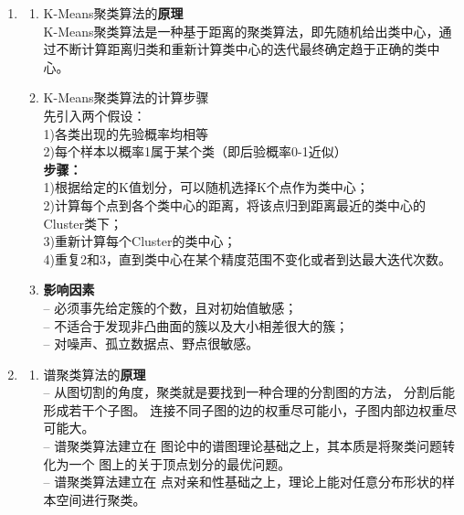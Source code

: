 \documentclass[a4paper,11pt,onecolumn,oneside,UTF8]{article}
\begin{document}
\begin{enumerate}
\begin{enumerate}[(1)]
            \end{enumerate}
      \item
            \begin{enumerate}[(1)]
                  \item K-Means聚类算法的\textbf{原理}\\
                        K-Means聚类算法是一种基于距离的聚类算法，即先随机给出类中心，通过不断计算距离归类和重新计算类中心的迭代最终确定趋于正确的类中心。
                  \item K-Means聚类算法的计算步骤\\
                        先引入两个假设：\\
                        1)各类出现的先验概率均相等\\
                        2)每个样本以概率1属于某个类（即后验概率0-1近似）\\
                        \textbf{步骤：}\\
                        1)根据给定的K值划分，可以随机选择K个点作为类中心；\\
                        2)计算每个点到各个类中心的距离，将该点归到距离最近的类中心的Cluster类下；\\
                        3)重新计算每个Cluster的类中心；\\
                        4)重复2和3，直到类中心在某个精度范围不变化或者到达最大迭代次数。
                  \item \textbf{影响因素}\\
                        – 必须事先给定簇的个数，且对初始值敏感；\\
                        – 不适合于发现非凸曲面的簇以及大小相差很大的簇；\\
                        – 对噪声、孤立数据点、野点很敏感。
            \end{enumerate}
      \item
            \begin{enumerate}[(1)]
                  \item 谱聚类算法的\textbf{原理}\\
                        – 从图切割的角度，聚类就是要找到一种合理的分割图的方法， 分割后能形成若干个子图。
                        连接不同子图的边的权重尽可能小，子图内部边权重尽可能大。\\
                        – 谱聚类算法建立在 图论中的谱图理论基础之上，其本质是将聚类问题转化为一个
                        图上的关于顶点划分的最优问题。\\
                        – 谱聚类算法建立在 点对亲和性基础之上，理论上能对任意分布形状的样本空间进行聚类。\\

\end{enumerate}
\end{enumerate}
\end{document}

